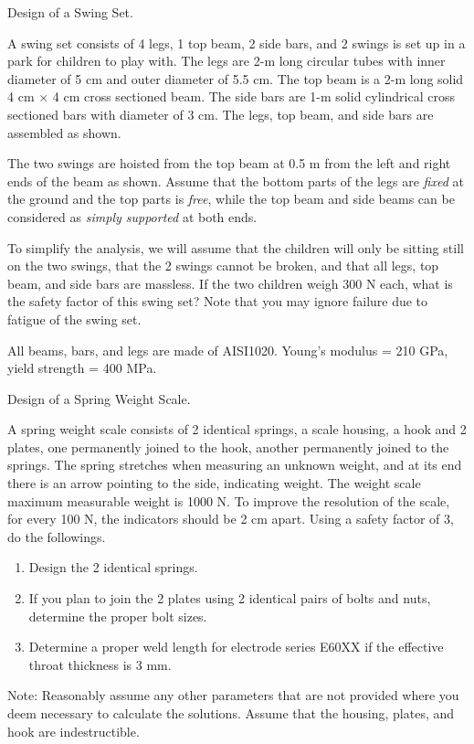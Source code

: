 \documentclass[
10pt,
a4paper,
openany,
svgnames,
]{book}
\newcommand{\exercise}{%
\item \label{lab:\arabic{chapter}-\arabic{exercisesi}}  %
}
\begin{document}
\begin{exercises}
  \exercise Design of a Swing Set.
  
  A swing set consists of 4 legs, 1 top beam, 2 side bars, and 2 swings is set up in a park for children to play with. The legs are 2-m long circular tubes with inner diameter of 5 cm and outer diameter of 5.5 cm. The top beam is a 2-m long solid 4 cm $\times$ 4 cm cross sectioned beam. The side bars are 1-m solid cylindrical cross sectioned bars with diameter of 3 cm. The legs, top beam, and side bars are assembled as shown.

  The two swings are hoisted from the top beam at 0.5 m from the left and right ends of the beam as shown. Assume that the bottom parts of the legs are \emph{fixed} at the ground and the top parts is \emph{free}, while the top beam and side beams can be considered as \emph{simply supported} at both ends.
  
  To simplify the analysis, we will assume that the children will only be sitting still on the two swings, that the 2 swings cannot be broken, and that all legs, top beam, and side bars are massless. If the two children weigh 300 N each, what is the safety factor of this swing set? Note that you may ignore failure due to fatigue of the swing set.
  
  All beams, bars, and legs are made of AISI1020. Young’s modulus = 210 GPa, yield strength = 400 MPa.
  
  \exercise Design of a Spring Weight Scale.
  
  A spring weight scale consists of 2 identical springs, a scale housing, a hook and 2 plates, one permanently joined to the hook, another permanently joined to the springs. The spring stretches when measuring an unknown weight, and at its end there is an arrow pointing to the side, indicating weight. The weight scale maximum measurable weight is 1000 N. To improve the resolution of the scale, for every 100 N, the indicators should be 2 cm apart. Using a safety factor of 3, do the followings.
  
  \begin{enumerate}
  \item Design the 2 identical springs.
  \item If you plan to join the 2 plates using 2 identical pairs of bolts and nuts, determine the proper bolt sizes.
  \item Determine a proper weld length for electrode series E60XX if the effective throat thickness is 3 mm.
  \end{enumerate}
  Note: Reasonably assume any other parameters that are not provided where you deem necessary to calculate the solutions. Assume that the housing, plates, and hook are indestructible.
  

\end{exercises}
\end{document}
